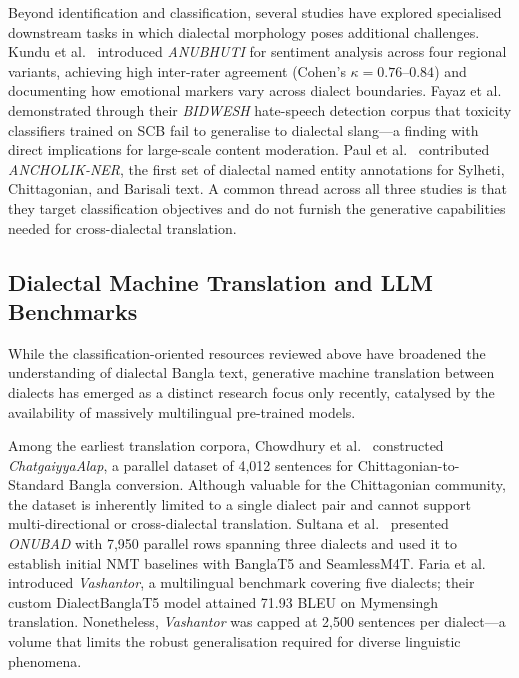 \documentclass[12pt,a4paper]{article}
\begin{document}
Beyond identification and classification, several studies have explored specialised downstream tasks in which dialectal morphology poses additional challenges. Kundu et al.~\cite{kundu2026anubhuti} introduced \textit{ANUBHUTI} for sentiment analysis across four regional variants, achieving high inter-rater agreement (Cohen's $\kappa = 0.76$--$0.84$) and documenting how emotional markers vary across dialect boundaries. Fayaz et al.~\cite{fayaz2025bidwesh} demonstrated through their \textit{BIDWESH} hate-speech detection corpus that toxicity classifiers trained on SCB fail to generalise to dialectal slang---a finding with direct implications for large-scale content moderation. Paul et al.~\cite{paul2025ancholik} contributed \textit{ANCHOLIK-NER}, the first set of dialectal named entity annotations for Sylheti, Chittagonian, and Barisali text. A common thread across all three studies is that they target classification objectives and do not furnish the generative capabilities needed for cross-dialectal translation.

\subsection{Dialectal Machine Translation and LLM Benchmarks}
While the classification-oriented resources reviewed above have broadened the understanding of dialectal Bangla text, generative machine translation between dialects has emerged as a distinct research focus only recently, catalysed by the availability of massively multilingual pre-trained models.

Among the earliest translation corpora, Chowdhury et al.~\cite{chowdhury2025chatgaiyya} constructed \textit{ChatgaiyyaAlap}, a parallel dataset of 4,012 sentences for Chittagonian-to-Standard Bangla conversion. Although valuable for the Chittagonian community, the dataset is inherently limited to a single dialect pair and cannot support multi-directional or cross-dialectal translation. Sultana et al.~\cite{sultana2025onubad} presented \textit{ONUBAD} with 7,950 parallel rows spanning three dialects and used it to establish initial NMT baselines with BanglaT5 and SeamlessM4T. Faria et al.~\cite{faria2025vashantor} introduced \textit{Vashantor}, a multilingual benchmark covering five dialects; their custom DialectBanglaT5 model attained 71.93 BLEU on Mymensingh translation. Nonetheless, \textit{Vashantor} was capped at 2,500 sentences per dialect---a volume that limits the robust generalisation required for diverse linguistic phenomena.
\end{document}
